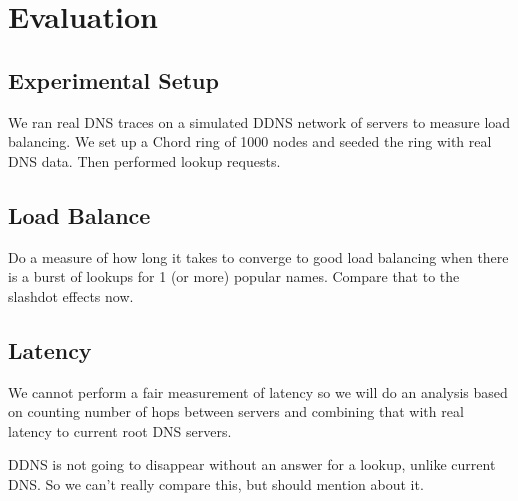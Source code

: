 \section{Evaluation}

\subsection{Experimental Setup}

We ran real DNS traces on a simulated DDNS network
of servers to measure load balancing. We set up a
Chord ring of 1000 nodes and seeded the ring with 
real DNS data. Then performed lookup requests.

\subsection{Load Balance}

Do a measure of how long it takes to converge to good load 
balancing when there is a burst of lookups for 1 (or more)
popular names. Compare that to the slashdot effects now.

\subsection{Latency}

We cannot perform a fair measurement of latency so we will do an
analysis based on counting number of hops between servers
and combining that with real latency to current root DNS servers.

DDNS is not going to disappear without an answer for a lookup,
unlike current DNS. So we can't really compare this, but should
mention about it.

